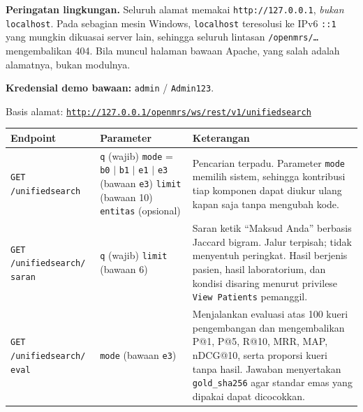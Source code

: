 \vspace{2ex}
\noindent
\textbf{Peringatan lingkungan.} Seluruh alamat memakai \texttt{http://127.0.0.1},
\emph{bukan} \texttt{localhost}. Pada sebagian mesin Windows, \texttt{localhost}
teresolusi ke IPv6 \texttt{::1} yang mungkin dikuasai server lain, sehingga
seluruh lintasan \texttt{/openmrs/\dots} mengembalikan 404. Bila muncul halaman
bawaan Apache, yang salah adalah alamatnya, bukan modulnya.

\vspace{1ex}
\noindent
\textbf{Kredensial demo bawaan:} \texttt{admin} / \texttt{Admin123}.

\vspace{3ex}

\noindent
Basis alamat: \href{\tautanRest}{\texttt{http://127.0.0.1/openmrs/ws/rest/v1/unifiedsearch}}

\vspace{1.5ex}
\renewcommand{\arraystretch}{1.3}
\begin{tabular}{@{}p{}p{}p{}@{}}
\toprule
\textbf{Endpoint} & \textbf{Parameter} & \textbf{Keterangan} \\
\midrule

\texttt{GET /unifiedsearch} &
\texttt{q} (wajib) \newline
\texttt{mode} = \texttt{b0} $|$ \texttt{b1} $|$ \texttt{e1} $|$ \texttt{e3}
  (bawaan \texttt{e3}) \newline
\texttt{limit} (bawaan 10) \newline
\texttt{entitas} (opsional) &
Pencarian terpadu. Parameter \texttt{mode} memilih sistem, sehingga kontribusi
tiap komponen dapat diukur ulang kapan saja tanpa mengubah kode. \\

\texttt{GET /unifiedsearch/} \newline \texttt{saran} &
\texttt{q} (wajib) \newline
\texttt{limit} (bawaan 6) &
Saran ketik ``Maksud Anda'' berbasis Jaccard bigram. Jalur terpisah; tidak
menyentuh peringkat. Hasil berjenis pasien, hasil laboratorium, dan kondisi
disaring menurut privilese \texttt{View Patients} pemanggil. \\

\texttt{GET /unifiedsearch/} \newline \texttt{eval} &
\texttt{mode} (bawaan \texttt{e3}) &
Menjalankan evaluasi atas 100 kueri pengembangan dan mengembalikan P@1, P@5,
R@10, MRR, MAP, nDCG@10, serta proporsi kueri tanpa hasil. Jawaban menyertakan
\texttt{gold\_sha256} agar standar emas yang dipakai dapat dicocokkan. \\

\bottomrule
\end{tabular}

